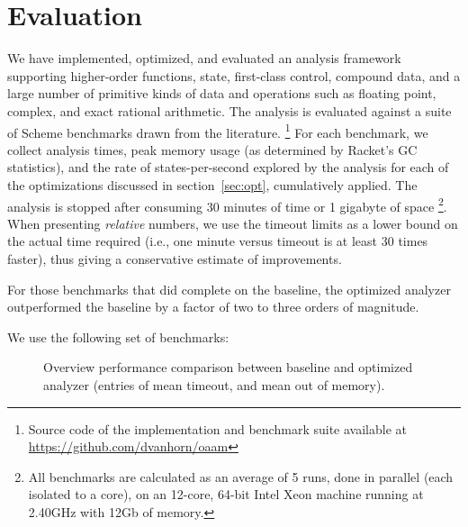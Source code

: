 \documentclass[9pt]{sigplanconf} %
\begin{document}
\section{Evaluation}
\label{sec:eval}

We have implemented, optimized, and evaluated an analysis framework supporting higher-order functions, state, first-class control, compound data, and a large number of primitive kinds of data and operations such as floating point, complex, and exact rational arithmetic.
%
The analysis is evaluated against a suite of Scheme benchmarks drawn from the literature.
\footnote{Source code of the implementation and benchmark suite available at \url{https://github.com/dvanhorn/oaam}}
%
For each benchmark, we collect analysis times, peak memory usage (as determined by Racket's GC statistics), and the rate of states-per-second explored by the analysis for each of the optimizations discussed in section~\ref{sec:opt}, cumulatively applied.
%
The analysis is stopped after consuming 30 minutes of time or 1 gigabyte of space
\footnote{All benchmarks are calculated as an average of 5 runs, done in parallel (each isolated to a core), on an 12-core, 64-bit Intel Xeon machine running at 2.40GHz with 12Gb of memory.}.
%
When presenting \emph{relative} numbers, we use the timeout limits as a lower bound on the actual time required (i.e., one minute versus timeout is at least 30 times faster), thus giving a conservative estimate of improvements.

%
%
For those benchmarks that did complete on the baseline, the optimized analyzer outperformed the baseline by a factor of two to three orders of magnitude.

We use the following set of benchmarks:
\begin{figure}
\centering

\caption{Overview performance comparison between baseline and
  optimized analyzer (entries of  mean timeout, and  mean out of memory).}
\label{fig:bench-overview}
\end{figure}
\end{document}
